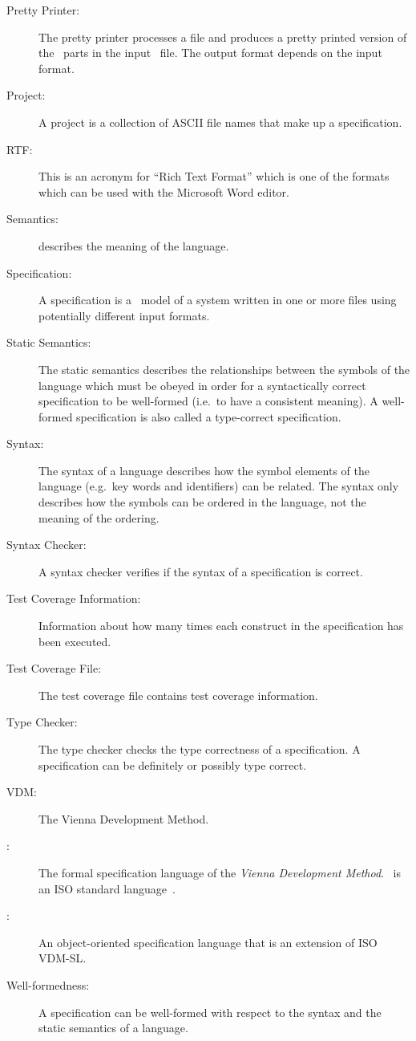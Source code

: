 \begin{description}
\item[Pretty Printer:] The pretty printer processes a file
  and produces a pretty printed version of the \vdmslpp\ parts in the
  input \vdmslpp\ file. The output format depends on the input format.


\item[Project:] A project is a collection of ASCII file names that make up
  a specification.


\item[RTF:] This is an acronym for ``Rich Text Format'' which is one
of the formats which can be used with the Microsoft Word editor.


\item[Semantics:] describes the meaning of the language. 


\item[Specification:] A specification is a \vdmslpp\ model of a system
  written in one or more files using potentially different input formats.
  
  
\item[Static Semantics:] The static semantics describes the
  relationships between the symbols of the language which must be
  obeyed in order for a syntactically correct specification to be
  well-formed (i.e.\ to have a consistent meaning). A well-formed
  specification is also called a type-correct specification.  


\item[Syntax:] The syntax of a language describes how the symbol
  elements of the language (e.g.\ key words and identifiers) can be related.
  The syntax only describes how the symbols can be ordered in the
  language, not the meaning of the ordering.


\item[Syntax Checker:] A syntax checker verifies if the syntax of a
  specification is correct.


\item[Test Coverage Information:] Information about how many times
  each construct in the specification has been executed.
  
  
\item[Test Coverage File:] The test coverage file contains test
  coverage information.
  
  
\item[Type Checker:] The type checker checks the type
  correctness of a specification. A specification can be definitely or
  possibly type correct.


\item[VDM:] The Vienna Development Method.


\item[\vdmsl:] The formal specification language of the {\em Vienna
    Development Method}. \vdmsl\ is an ISO standard
  language~\cite{ISOVDM96}. 


\item[\vdmpp:] An object-oriented specification language
 that is an extension of ISO VDM-SL.


\item[Well-formedness:] A specification can be well-formed with
  respect to the syntax and the static semantics of a language.


\end{description}
